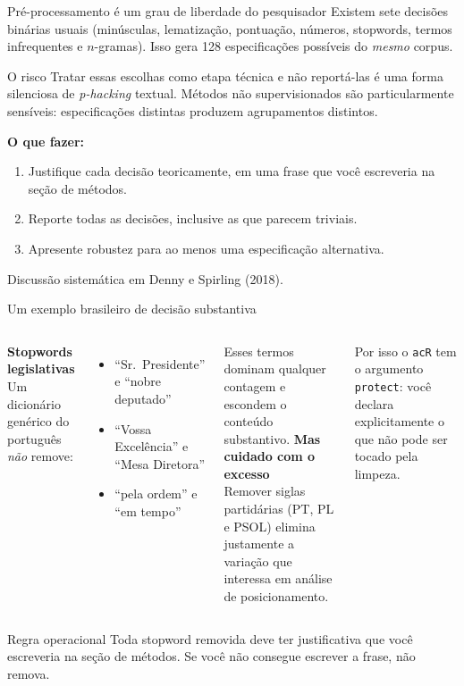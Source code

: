 \documentclass[11pt,aspectratio=169]{beamer}
\begin{document}
\begin{frame}{Pré-processamento é um grau de liberdade do pesquisador}
Existem sete decisões binárias usuais (minúsculas, lematização, pontuação,
números, stopwords, termos infrequentes e $n$-gramas). Isso gera 128
especificações possíveis do \emph{mesmo} corpus.
\vspace{0.2cm}
\begin{alertblock}{O risco}
\small Tratar essas escolhas como etapa técnica e não reportá-las é uma forma
silenciosa de \emph{p-hacking} textual. Métodos não supervisionados são
particularmente sensíveis: especificações distintas produzem agrupamentos
distintos.
\end{alertblock}
\vspace{0.2cm}
\textbf{O que fazer:}
\begin{enumerate}\small
  \item Justifique cada decisão teoricamente, em uma frase que você escreveria na
        seção de métodos.
  \item Reporte todas as decisões, inclusive as que parecem triviais.
  \item Apresente robustez para ao menos uma especificação alternativa.
\end{enumerate}
\vspace{0.15cm}
\footnotesize Discussão sistemática em Denny e Spirling (2018).
\end{frame}

\begin{frame}{Um exemplo brasileiro de decisão substantiva}
\begin{columns}[T]
\textbf{Stopwords legislativas}\\[0.12cm]
\small
Um dicionário genérico do português \emph{não} remove:
\begin{itemize}\scriptsize
  \item ``Sr.\ Presidente'' e ``nobre deputado''
  \item ``Vossa Excelência'' e ``Mesa Diretora''
  \item ``pela ordem'' e ``em tempo''
\end{itemize}
\vspace{0.1cm}
\scriptsize Esses termos dominam qualquer contagem e escondem o conteúdo
substantivo.
\textbf{Mas cuidado com o excesso}\\[0.12cm]
\small
Remover siglas partidárias (PT, PL e PSOL) elimina justamente a variação que
interessa em análise de posicionamento.
\vspace{0.15cm}

\scriptsize Por isso o \texttt{acR} tem o argumento \texttt{protect}: você
declara explicitamente o que não pode ser tocado pela limpeza.
\end{columns}
\pause
\vspace{0.3cm}
\begin{block}{Regra operacional}
\small Toda stopword removida deve ter justificativa que você escreveria na
seção de métodos. Se você não consegue escrever a frase, não remova.
\end{block}
\end{frame}
\end{document}
